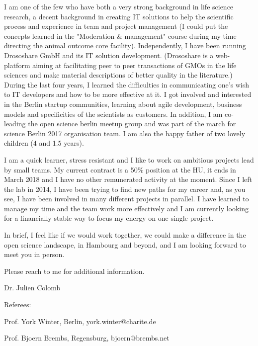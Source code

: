 I am one of the few who have both a very strong background in life science research, a decent background in creating IT solutions to help the scientific process and experience in team and project management (I could put the concepts learned in the "Moderation \& management" course during my time directing the animal outcome core facility). 
Independently, I have been running Drososhare GmbH and its IT solution development. (Drososhare is a web-platform aiming at facilitating peer to peer transactions of GMOs in the life sciences and make material descriptions of better quality in the literature.) During the last four years, I learned the difficulties in communicating one's wish to IT developers and how to be more effective at it. I got involved and interested in the Berlin startup communities, learning about agile development, business models and specificities of the scientists as customers. In addition, I am co-leading the open science berlin meetup group and was part of the march for science Berlin 2017 organisation team. I am also the happy father of two lovely children (4 and 1.5 years).

\newpage 

I am  a quick learner, stress resistant and I like to work on ambitious projects lead by small teams. My current contract is a 50\% position at the HU, it ends in March 2018 and I have no other remunerated activity at the moment. 
Since I left the lab in 2014, I have been trying to find new paths for my career and,
as you see, I have been involved in many different projects in parallel. I have learned to manage my time and the team work more effectively and I am currently looking for a financially stable way to focus my energy on one single project. 

In brief, I feel like if we would work together, we could make a difference in the open science landscape, in Hambourg and beyond,
and I am looking forward to meet you in person.

Please reach to me for additional information.

Dr. Julien Colomb


\vspace {1.5cm} 

Referees:

Prof. York Winter, Berlin, york.winter@charite.de
 
 
Prof. Bjoern Brembs, Regensburg, bjoern@brembs.net
